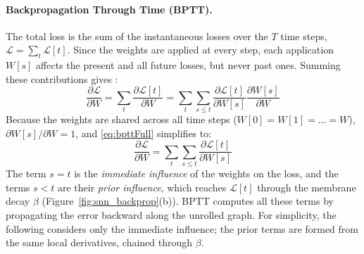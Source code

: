     \paragraph{Backpropagation Through Time (BPTT).}
    The total loss is the sum of the instantaneous losses over the $T$ time steps, $\mathcal{L} = \sum_{t}\mathcal{L}[t]$. Since the weights are applied at every step, each application $W[s]$ affects the present and all future losses, but never past ones. Summing these contributions gives \cite{eshraghianTrainingSpikingNeural2023}:
    \begin{equation}
        \frac{\partial\mathcal{L}}{\partial W} = \sum_{t}\frac{\partial\mathcal{L}[t]}{\partial W} = \sum_{t}\sum_{s \le t}\frac{\partial\mathcal{L}[t]}{\partial W[s]}\frac{\partial W[s]}{\partial W}
        \label{eq:bpttFull}
    \end{equation}
    Because the weights are shared across all time steps ($W[0]=W[1]=\dots=W$), $\partial W[s]/\partial W=1$, and \eqref{eq:bpttFull} simplifies to:
    \begin{equation}
        \frac{\partial\mathcal{L}}{\partial W}=\sum_{t}\sum_{s \le t}\frac{\partial\mathcal{L}[t]}{\partial W[s]}
        \label{eq:bptt}
    \end{equation}
    The term $s=t$ is the \emph{immediate influence} of the weights on the loss, and the terms $s<t$ are their \emph{prior influence}, which reaches $\mathcal{L}[t]$ through the membrane decay $\beta$ (Figure~\ref{fig:snn_backprop}(b)). BPTT computes all these terms by propagating the error backward along the unrolled graph. For simplicity, the following considers only the immediate influence; the prior terms are formed from the same local derivatives, chained through $\beta$.

